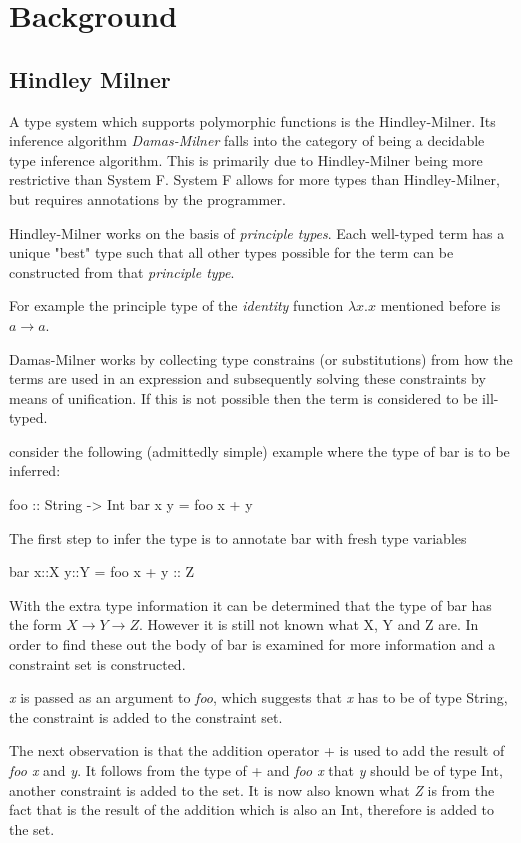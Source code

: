 \chapter{Background}
\section{Hindley Milner}
A type system which supports polymorphic functions is the Hindley-Milner\cite{HM}. Its inference algorithm \emph{Damas-Milner} falls into the category of being a decidable type inference algorithm. This is primarily due to Hindley-Milner being more restrictive than System F. System F allows for more types than Hindley-Milner, but requires annotations by the programmer.

Hindley-Milner works on the basis of \textit{principle types}. Each well-typed term has a unique "best" type such that all other types possible for the term can be constructed from that \textit{principle type}. 

For example the principle type of the \textit{identity} function $\lambda x.x$ mentioned before is $a \rightarrow a$.

Damas-Milner works by collecting type constrains (or substitutions) from how the terms are used in an expression and subsequently solving these constraints by means of unification. If this is not possible then the term is considered to be ill-typed.

consider the following (admittedly simple) example where the type of bar is to be inferred:
\begin{code}
foo :: String -> Int
bar x y = foo x + y
\end{code}

The first step to infer the type is to annotate bar with fresh type variables 
\begin{code}
bar x::X y::Y = foo x + y :: Z
\end{code}

With the extra type information it can be determined that the type of bar has the form $X \rightarrow Y \rightarrow Z$. However it is still not known what X, Y and Z are. In order to find these out the body of bar is examined for more information and a constraint set is constructed.

\emph{x} is passed as an argument to \emph{foo}, which suggests that \emph{x} has to be of type String, the constraint  is added to the constraint set.

The next observation is that the addition operator + is used to add the result of \emph{foo x} and \emph{y}. It follows from the type of + and \emph{foo x} that \emph{y} should be of type Int, another constraint  is added to the set. It is now also known what \emph{Z} is from the fact that is the result of the addition which is also an Int, therefore  is added to the set.

